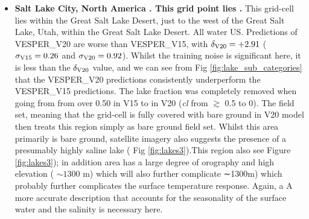 \documentclass[hess, twostagejnl]{copernicus}
\providecommand{\DIFadd}[1]{{\protect\color{blue} \sf #1}} %
\providecommand{\DIFdel}[1]{{\protect\color{red} \scriptsize #1}} %
\providecommand{\DIFaddbegin}{} %
\providecommand{\DIFaddend}{} %
\providecommand{\DIFdelbegin}{} %
\providecommand{\DIFdelend}{} %
\begin{document}
\begin{itemize}
	\item \textbf{Salt Lake City, North America\DIFdelbegin %
\DIFdel{. This grid point lies }\DIFdelend \DIFaddbegin \DIFadd{.}} \DIFadd{This grid-cell lies within the Great Salt Lake Desert, }\DIFaddend just to the west of the Great Salt Lake, Utah, \DIFdelbegin \DIFdel{within the Great Salt Lake Desert. All water }\DIFdelend \DIFaddbegin \DIFadd{US. Predictions of VESPER\_V20 are worse than VESPER\_V15, with $\delta_{\rm V20} = +2.91$ ($\sigma_{\rm V15} = 0.26$ and $\sigma_{\rm V20}=0.92$). Whilst the training noise is significant here, it is less than the $\delta_{\rm V20}$ value, and we can see from Fig \ref{fig:lake_sub_categories} that the VESPER\_V20 predictions consistently underperform the VESPER\_V15 predictions. The lake fraction }\DIFaddend was completely removed \DIFdelbegin \DIFdel{when going from }\DIFdelend \DIFaddbegin \DIFadd{from over 0.50 in }\DIFaddend V15 to \DIFaddbegin \DIFadd{0.00 in }\DIFaddend V20 \DIFdelbegin \DIFdel{(\textit{cl} from $\gtrsim$ 0.5 to 0). The }\DIFdelend \DIFaddbegin \DIFadd{field set, meaning that the grid-cell is fully covered with bare ground in }\DIFaddend V20 \DIFdelbegin \DIFdel{model then treats this region simply as bare ground }\DIFdelend \DIFaddbegin \DIFadd{field set}\DIFaddend . Whilst this area primarily is bare ground, satellite imagery also suggests the presence of a presumably highly saline lake (\DIFdelbegin \DIFdel{Fig \ref{fig:lakes3}).This region also }\DIFdelend \DIFaddbegin \DIFadd{see Figure \ref{fig:lakes3}); in addition area }\DIFaddend has a large degree of orography and high elevation (\DIFdelbegin \DIFdel{$\sim 1300$ m) which will also further complicate }\DIFdelend \DIFaddbegin \DIFadd{∼1300m) which probably further complicates }\DIFaddend the surface temperature response. \DIFdelbegin \DIFdel{Again, a }\DIFdelend \DIFaddbegin \DIFadd{A }\DIFaddend more accurate description that accounts for the seasonality of the surface water and the salinity is necessary here.


\end{itemize}
\end{document}
